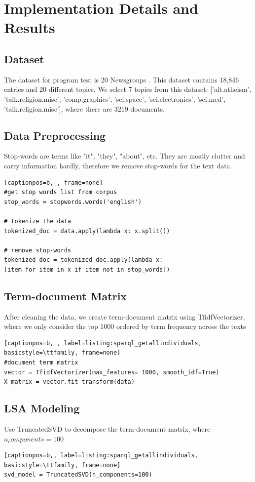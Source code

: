 \documentclass[12pt]{article}
\begin{document}
\section{Implementation Details and Results} 
\subsection{Dataset}
\par 
The dataset for program test is 20 Newsgroups \cite{news}. This dataset contains 18,846 entries and 20 different topics. We select 7 topics from this dataset:  
['alt.atheism',
'talk.religion.misc',
'comp.graphics',
'sci.space',
'sci.electronics', 
'sci.med',
'talk.religion.misc'], where there are 3219 documents.
\subsection{Data Preprocessing}
Stop-words are terms like "it", "they", "about", etc. They are mostly clutter and carry information hardly, therefore we remove stop-words for the text data.
\begin{lstlisting}[captionpos=b, , frame=none]
#get stop words list from corpus
stop_words = stopwords.words('english')

# tokenize the data
tokenized_doc = data.apply(lambda x: x.split())

# remove stop-words
tokenized_doc = tokenized_doc.apply(lambda x: 
[item for item in x if item not in stop_words])
\end{lstlisting}
\subsection{Term-document Matrix}
After cleaning the data, we create term-document matrix using TfidfVectorizer, where we only consider the top 1000 ordered by term frequency across the texts
\begin{lstlisting}[captionpos=b, , label=listing:sparql_getallindividuals,
basicstyle=\ttfamily, frame=none]
#document term matrix
vector = TfidfVectorizer(max_features= 1000, smooth_idf=True)
X_matrix = vector.fit_transform(data)
\end{lstlisting}

\subsection{LSA Modeling}
Use TruncatedSVD to decompose the term-document matrix, where $n_components = 100$
\begin{lstlisting}[captionpos=b,, label=listing:sparql_getallindividuals,
basicstyle=\ttfamily, frame=none]
svd_model = TruncatedSVD(n_components=100)
\end{lstlisting}
\end{document}
